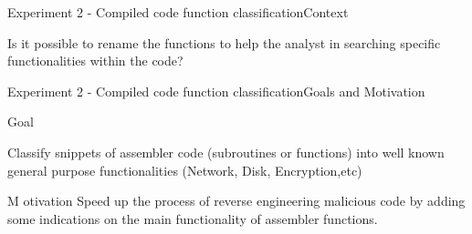 \documentclass[xcolor=table]{beamer}
\begin{document}
\begin{frame}{Experiment 2 - Compiled code function classification}{Context}


Is it possible to rename the functions to help the analyst in searching specific functionalities within the code?



\nocite{code2vec} \nocite{139} 









\end{frame}




\begin{frame}{Experiment 2 - Compiled code function classification}{Goals and Motivation}

\begin{block}{Goal}{
       
        Classify snippets of assembler code (subroutines or functions) into well known general purpose functionalities (Network, Disk, Encryption,etc)

    }\end{block}
    \begin{block}{M otivation}{
        Speed up the process of reverse engineering malicious code by adding some indications on the main functionality of assembler functions.
    }\end{block}
\end{frame}
\end{document}
